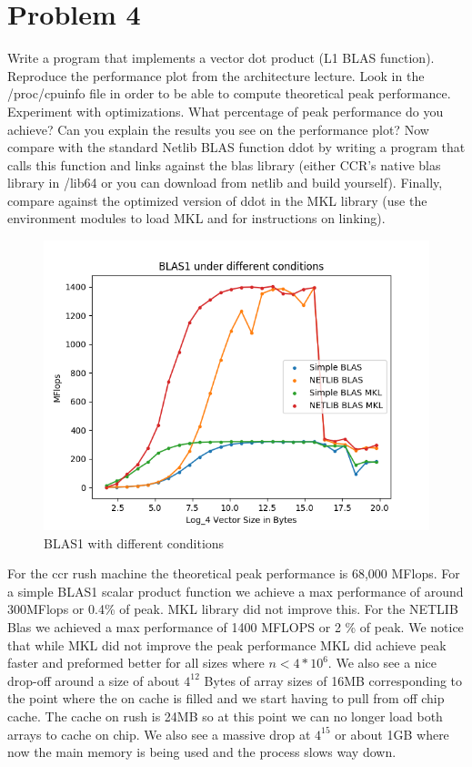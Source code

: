 \documentclass[12pt]{article}
\theoremstyle{plain}
\theoremstyle{definition}
\begin{document}
 
\section*{Problem 4}
Write a program that implements a vector dot product (L1 BLAS function). Reproduce
the performance plot from the architecture lecture. Look in the /proc/cpuinfo file in
order to be able to compute theoretical peak performance. Experiment with optimizations.
What percentage of peak performance do you achieve? Can you explain the results
you see on the performance plot?
Now compare with the standard Netlib BLAS function ddot by writing a program that
calls this function and links against the blas library (either CCR’s native blas library in
/lib64 or you can download from netlib and build yourself).
Finally, compare against the optimized version of ddot in the MKL library (use the
environment modules to load MKL and for instructions on linking).

\begin{figure}  
\label{fig:problem4}
\includegraphics[scale=0.7]{problem4.png}
\caption{BLAS1 with different conditions}
\end{figure}

For the ccr rush machine the theoretical peak performance is 68,000 MFlops. For a simple BLAS1 scalar product function we achieve a max performance of around 300MFlops or 0.4\% of peak. MKL library did not improve this. For the NETLIB Blas we achieved a max performance of 1400 MFLOPS or 2 \% of peak. We notice that while MKL did not improve the peak performance MKL did achieve peak faster and preformed better for all sizes where $n < 4 *10^6$. We also see a nice drop-off around a size of about $4^{12}$ Bytes of array sizes of 16MB corresponding to the point where the on cache is filled and we start having to pull from off chip cache. The cache on rush is 24MB so at this point we can no longer load both arrays to cache on chip. We also see a massive drop at $4^{15}$ or about 1GB where now the main memory is being used and the process slows way down.
\end{document}
